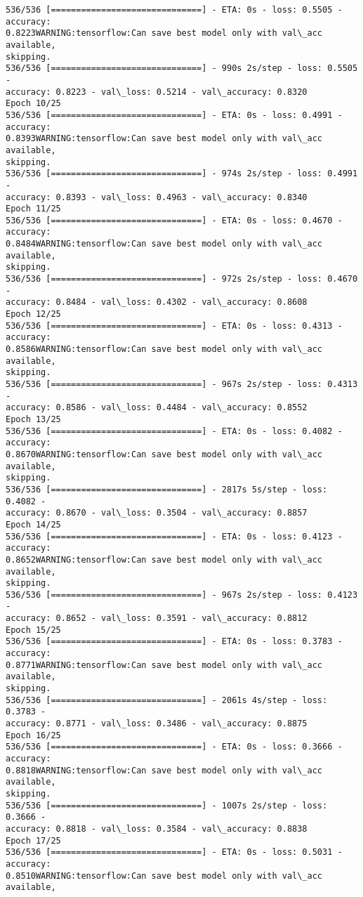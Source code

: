 \documentclass[11pt]{article}
\begin{document}
\begin{Verbatim}[commandchars=\\\{\}]
536/536 [==============================] - ETA: 0s - loss: 0.5505 - accuracy:
0.8223WARNING:tensorflow:Can save best model only with val\_acc available,
skipping.
536/536 [==============================] - 990s 2s/step - loss: 0.5505 -
accuracy: 0.8223 - val\_loss: 0.5214 - val\_accuracy: 0.8320
Epoch 10/25
536/536 [==============================] - ETA: 0s - loss: 0.4991 - accuracy:
0.8393WARNING:tensorflow:Can save best model only with val\_acc available,
skipping.
536/536 [==============================] - 974s 2s/step - loss: 0.4991 -
accuracy: 0.8393 - val\_loss: 0.4963 - val\_accuracy: 0.8340
Epoch 11/25
536/536 [==============================] - ETA: 0s - loss: 0.4670 - accuracy:
0.8484WARNING:tensorflow:Can save best model only with val\_acc available,
skipping.
536/536 [==============================] - 972s 2s/step - loss: 0.4670 -
accuracy: 0.8484 - val\_loss: 0.4302 - val\_accuracy: 0.8608
Epoch 12/25
536/536 [==============================] - ETA: 0s - loss: 0.4313 - accuracy:
0.8586WARNING:tensorflow:Can save best model only with val\_acc available,
skipping.
536/536 [==============================] - 967s 2s/step - loss: 0.4313 -
accuracy: 0.8586 - val\_loss: 0.4484 - val\_accuracy: 0.8552
Epoch 13/25
536/536 [==============================] - ETA: 0s - loss: 0.4082 - accuracy:
0.8670WARNING:tensorflow:Can save best model only with val\_acc available,
skipping.
536/536 [==============================] - 2817s 5s/step - loss: 0.4082 -
accuracy: 0.8670 - val\_loss: 0.3504 - val\_accuracy: 0.8857
Epoch 14/25
536/536 [==============================] - ETA: 0s - loss: 0.4123 - accuracy:
0.8652WARNING:tensorflow:Can save best model only with val\_acc available,
skipping.
536/536 [==============================] - 967s 2s/step - loss: 0.4123 -
accuracy: 0.8652 - val\_loss: 0.3591 - val\_accuracy: 0.8812
Epoch 15/25
536/536 [==============================] - ETA: 0s - loss: 0.3783 - accuracy:
0.8771WARNING:tensorflow:Can save best model only with val\_acc available,
skipping.
536/536 [==============================] - 2061s 4s/step - loss: 0.3783 -
accuracy: 0.8771 - val\_loss: 0.3486 - val\_accuracy: 0.8875
Epoch 16/25
536/536 [==============================] - ETA: 0s - loss: 0.3666 - accuracy:
0.8818WARNING:tensorflow:Can save best model only with val\_acc available,
skipping.
536/536 [==============================] - 1007s 2s/step - loss: 0.3666 -
accuracy: 0.8818 - val\_loss: 0.3584 - val\_accuracy: 0.8838
Epoch 17/25
536/536 [==============================] - ETA: 0s - loss: 0.5031 - accuracy:
0.8510WARNING:tensorflow:Can save best model only with val\_acc available,

\end{Verbatim}
\end{document}
